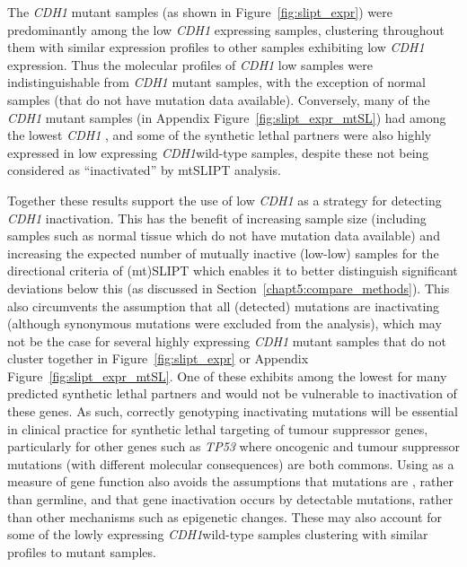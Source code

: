 
The \textit{CDH1} \gls{mutant} samples (as shown in Figure~\ref{fig:slipt_expr}) were predominantly among the low \textit{CDH1} expressing samples, clustering throughout them with similar expression profiles to other samples exhibiting low \textit{CDH1} expression. Thus the molecular profiles of \textit{CDH1} low samples were indistinguishable from \textit{CDH1} \gls{mutant} samples, with the exception of normal samples (that do not have  \gls{mutation} data available). Conversely, many of the \textit{CDH1} \gls{mutant} samples (in Appendix Figure~\ref{fig:slipt_expr_mtSL}) had among the lowest \textit{CDH1} , and some of the \gls{synthetic lethal} partners were also highly expressed in low expressing \textit{CDH1}\gls{wild-type} samples, despite these not being considered as ``inactivated'' by \acrshort{mtSLIPT} analysis.

Together these results support the use of low \textit{CDH1}  as a strategy for detecting \textit{CDH1} inactivation. This has the benefit of increasing sample size (including samples such as normal tissue which do not have  \gls{mutation} data available) and increasing the expected number of mutually inactive (low-low) samples for the directional criteria of (mt)\gls{SLIPT} which enables it to better distinguish significant deviations below this (as discussed in Section~\ref{chapt5:compare_methods}). This also circumvents the assumption that all (detected) \glspl{mutation} are inactivating (although synonymous \glspl{mutation} were excluded from the analysis), which may not be the case for several highly expressing \textit{CDH1} \gls{mutant} samples that do not cluster together in Figure~\ref{fig:slipt_expr} or Appendix Figure~\ref{fig:slipt_expr_mtSL}. One of these exhibits among the lowest  for many predicted \gls{synthetic lethal} partners and would not be vulnerable to inactivation of these genes. As such, correctly genotyping inactivating \glspl{mutation} will be \gls{essential} in clinical practice for \gls{synthetic lethal} targeting of \gls{tumour suppressor} genes, particularly for other genes such as \textit{TP53} where oncogenic and \gls{tumour suppressor} \glspl{mutation} (with different molecular consequences) are both commons. Using  as a measure of gene function also avoids the assumptions that \glspl{mutation} are , rather than \gls{germline}, and that gene inactivation occurs by detectable \glspl{mutation}, rather than other mechanisms such as epigenetic changes. These may also account for some of the lowly expressing \textit{CDH1}\gls{wild-type} samples clustering with similar profiles to \gls{mutant} samples.

